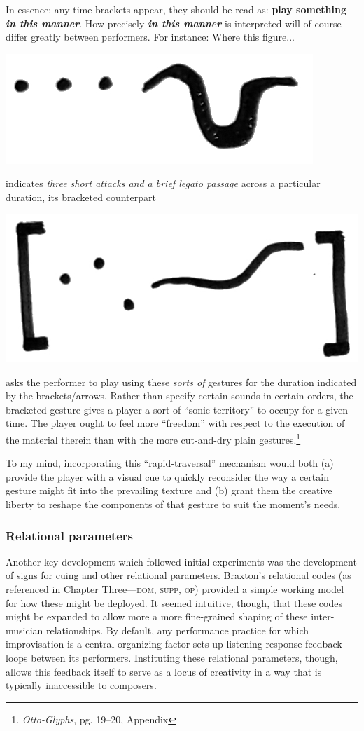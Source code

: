     \begin{smallquote}
            In essence: any time brackets appear, they should be read as: \textbf{play something \textit{in this manner}}. How precisely \textbf{\textit{in this manner}} is interpreted will of course differ greatly between performers. For instance: Where this figure...

            \begin{center}
            \includegraphics[width=.2\textwidth]{images/chapter4/01-3dotscurve.png}
            \end{center}
            
            \noindent indicates \textit{three short attacks and a brief legato passage} across a particular duration, its bracketed counterpart

            \begin{center}
            \includegraphics[width=.2\textwidth]{images/chapter4/01-3dotscurvebracket2.png}
            \end{center}
            
            \noindent asks the performer to play using these \textit{sorts of} gestures for the duration indicated by the brackets/arrows. Rather than specify certain sounds in certain orders, the bracketed gesture gives a player a sort of ``sonic territory'' to occupy for a given time. The player ought to feel more ``freedom'' with respect to the execution of the material therein than with the more cut-and-dry plain gestures.\footnote{\textit{Otto-Glyphs}, pg. 19--20, Appendix}
    \end{smallquote}

    To my mind, incorporating this ``rapid-traversal'' mechanism would both (a) provide the player with a visual cue to quickly reconsider the way a certain gesture might fit into the prevailing texture and (b) grant them the creative liberty to reshape the components of that gesture to suit the moment's needs.

    \subsubsection{Relational parameters}
    Another key development which followed initial experiments was the development of signs for cuing and other relational parameters. Braxton's relational codes (as referenced in Chapter Three---\textsc{dom}, \textsc{supp}, \textsc{op}) provided a simple working model for how these might be deployed. It seemed intuitive, though, that these codes might be expanded to allow more a more fine-grained shaping of these inter-musician relationships. By default, any performance practice for which improvisation is a central organizing factor sets up listening-response feedback loops between its performers. Instituting these relational parameters, though, allows this feedback itself to serve as a locus of creativity in a way that is typically inaccessible to composers.

